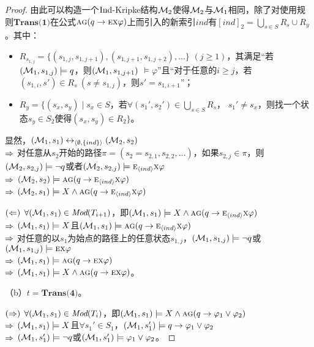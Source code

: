 \begin{proof}
	由此可以构造一个$\textrm{Ind}$-Kripke结构${\cal M}_2$使得${\cal M}_2$与${\cal M}_1$相同，除了对使用规则$\textbf{Trans(1)}$在公式$\textsc{a}\textsc{g}(q \rightarrow \textsc{e} \textsc{x} \varphi)$上而引入的新索引$ind$有$[ind]_2=\bigcup_{s\in S} R_s \cup R_y$。其中：
	\begin{itemize}
		\item $R_{s_{1,j}}=\{(s_{1,j}, s_{1,j+1}), (s_{1,j+1}, s_{1,j+2}),\dots\}$ $(j\geq 1)$，其满足“若$({\cal M}_1,s_{1,j}) \models q$，则$({\cal M}_1,s_{1,j+1})$ $\models \varphi$”且“对于任意的$i\geq j$，若$(s_{1,i}, s') \in R_s\ (s \not= s_{1,j})$，则$s'=s_{1,i+1}$”；
		\item $R_y=\{(s_x,s_y)\mid s_x\in S$，若$\forall(s_1',s_2') \in \bigcup_{s\in S} R_s$， $s_1'\not= s_x$，则找一个状态$s_y\in S_2$使得$(s_x,s_y)\in R_2\}$。
	\end{itemize}

显然，$({\cal M}_1,s_1) \leftrightarrow_{{\langle{\emptyset,\{ind\}}\rangle}} ({\cal M}_2,s_2)$\\
$\Rightarrow$ 对任意从$s_2$开始的路径$\pi=( s_2= s_{2,1} , s_{2,2}, \dots)$，如果$s_{2,j} \in \pi$，则$({\cal M}_2,s_{2,j}) \models \neg q$或者$({\cal M}_2,s_{2,j}) \models \textsc{e}_{{\langle{ind}\rangle}} \textsc{x} \varphi$\\
$\Rightarrow$ $({\cal M}_2,s_2)\models \textsc{a}\textsc{g}(q \rightarrow \textsc{e}_{{\langle{ind}\rangle}} \textsc{x} \varphi)$\\
$\Rightarrow$ $({\cal M}_2,s_1) \models X \wedge \textsc{a}\textsc{g}(q \rightarrow \textsc{e}_{{\langle{ind}\rangle}} \textsc{x} \varphi)$

$(\Leftarrow)$ $\forall ({\cal M}_1,s_1) \in \textit{Mod}(T_{i+1})$，即$({\cal M}_1,s_1) \models X \wedge \textsc{a} \textsc{g}(q \rightarrow \textsc{e}_{{\langle{ind}\rangle}} \textsc{x} \varphi )$\\
$\Rightarrow$ $({\cal M}_1,s_1) \models X$且$({\cal M}_1,s_1) \models \textsc{a} \textsc{g}(q \rightarrow \textsc{e}_{{\langle{ind}\rangle}} \textsc{x} \varphi)$\\
$\Rightarrow$ 对任意的以$s_1$为始点的路径上的任意状态$s_{1,j}$，$({\cal M}_1,s_{1,j}) \models \neg q$或$({\cal M}_1,s_{1,j}) \models \textsc{e}\textsc{x}\varphi$\\
$\Rightarrow$ $({\cal M}_1,s_1) \models \textsc{a}\textsc{g}(q \rightarrow \textsc{e} \textsc{x} \varphi)$\\
$\Rightarrow$ $({\cal M}_1,s_1) \models X \wedge \textsc{a}\textsc{g}(q \rightarrow \textsc{e} \textsc{x} \varphi)$。

	（b）$t=\textbf{Trans(4)}$。
	
   $(\Rightarrow)$	$\forall({\cal M}_1,s_1) \in \textit{Mod}(T_i)$，即$({\cal M}_1,s_1) \models X \wedge \textsc{a}\textsc{g} (q \rightarrow \varphi_1 \vee \varphi_2)$ \\
   $\Rightarrow$ $({\cal M}_1,s_1) \models X$且$\forall s_1'\in S_1$，$({\cal M}_1, s_1') \models q \rightarrow \varphi_1 \vee \varphi_2$\\
   $\Rightarrow$ $({\cal M}_1,s_1')\models \neg q$或$({\cal M}_1,s_1')\models \varphi_1 \vee \varphi_2$。
   

\end{proof}
